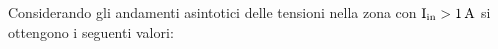 Considerando gli andamenti asintotici delle tensioni nella zona con $\mathrm{I_{in}}>1\rm \, A$ si ottengono i seguenti valori:


